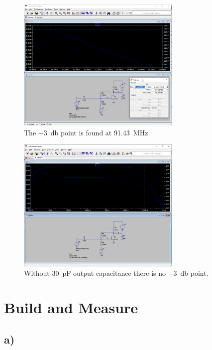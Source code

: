 \documentclass{article}
\begin{document}
	\begin{figure}[H]
	    \centering
	    \includegraphics[width=0.7\textwidth]{2a-4}
	    \caption{The \SI{-3}{\decibel} point is found at \SI{91.43}{\mega\hertz}}
	\end{figure}
	
	\begin{figure}[H]
	    \centering
	    \includegraphics[width=0.7\textwidth]{2a-5}
	    \caption{Without \SI{30}{\pico\farad} output capacitance there is no \SI{-3}{\decibel} point.}
	\end{figure}
	
	

	\section{Build and Measure}
	
	\subsection*{a)}
	
\end{document}
